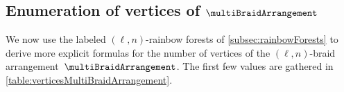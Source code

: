\documentclass{amsart}
\theoremstyle{definition}
\begin{document}

\subsection{Enumeration of vertices of $\multiBraidArrangement$}
\label{subsec:verticesMultiBraidArrangement}

We now use the labeled $(\ell,n)$-rainbow forests of \cref{subsec:rainbowForests} to derive more explicit formulas for the number of vertices of the $(\ell,n)$-braid arrangement~$\multiBraidArrangement$.
The first few values are gathered in \cref{table:verticesMultiBraidArrangement}.
 
\begin{table}
	\centerline{}
	\vspace{.3cm}
	\caption{The numbers $f_0(\multiBraidArrangement) = \ell \big( (\ell-1) n + 1 \big)^{n-2}$ of vertices of~$\multiBraidArrangement$ for~$\ell,n \in [8]$.}
	\label{table:verticesMultiBraidArrangement}
\end{table}
\end{document}
